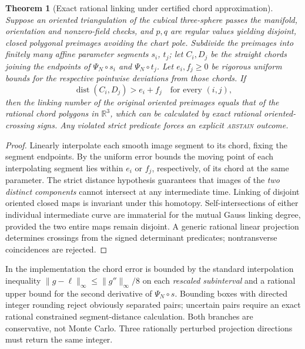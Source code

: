 \documentclass[aps,prd,onecolumn,notitlepage,11pt,superscriptaddress,longbibliography]{revtex4-2}
\newtheorem{theorem}{Theorem}
\begin{document}
\begin{theorem}[Exact rational linking under certified chord approximation]\label{th:v10-link}
Suppose an oriented triangulation of the cubical three-sphere passes the manifold, orientation and nonzero-field checks, and $p,q$ are regular values yielding disjoint, closed polygonal preimages avoiding the chart pole. Subdivide the preimages into finitely many affine parameter segments $s_i$, $t_j$; let $C_i,D_j$ be the straight chords joining the endpoints of $\Psi_N\circ s_i$ and $\Psi_N\circ t_j$. Let $e_i,f_j\ge0$ be rigorous uniform bounds for the respective pointwise deviations from those chords. If
\begin{equation}\label{eq:v10-separation}
\boxed{\operatorname{dist}(C_i,D_j)>e_i+f_j \quad\text{for every }(i,j),}
\end{equation}
then the linking number of the original oriented preimages equals that of the rational chord polygons in $\mathbb R^3$, which can be calculated by exact rational oriented-crossing signs. Any violated strict predicate forces an explicit \textsc{abstain} outcome.
\end{theorem}
\begin{proof}
Linearly interpolate each smooth image segment to its chord, fixing the segment endpoints. By the uniform error bounds the moving point of each interpolating segment lies within $e_i$ or $f_j$, respectively, of its chord at the same parameter. The strict distance hypothesis guarantees that images of the \emph{two distinct components} cannot intersect at any intermediate time. Linking of disjoint oriented closed maps is invariant under this homotopy. Self-intersections of either individual intermediate curve are immaterial for the mutual Gauss linking degree, provided the two entire maps remain disjoint. A generic rational linear projection determines crossings from the signed determinant predicates; nontransverse coincidences are rejected.\end{proof}

In the implementation the chord error is bounded by the standard interpolation inequality $\|g-\ell\|_\infty\le \|g''\|_\infty/8$ on each \emph{rescaled subinterval} and a rational upper bound for the second derivative of $\Psi_N\circ s$. Bounding boxes with directed integer rounding reject obviously separated pairs; uncertain pairs require an exact rational constrained segment-distance calculation. Both branches are conservative, not Monte Carlo. Three rationally perturbed projection directions must return the same integer.
\end{document}
